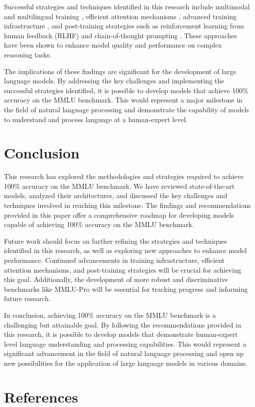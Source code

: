 \documentclass[conference]{IEEEtran}
\begin{document}
Successful strategies and techniques identified in this research include multimodal and multilingual training \cite{goodfellow2016deep}, efficient attention mechanisms \cite{vaswani2017attention}, advanced training infrastructure \cite{dean2012large}, and post-training strategies such as reinforcement learning from human feedback (RLHF) \cite{christiano2017deep} and chain-of-thought prompting \cite{wei2022chain}. These approaches have been shown to enhance model quality and performance on complex reasoning tasks.

The implications of these findings are significant for the development of large language models. By addressing the key challenges and implementing the successful strategies identified, it is possible to develop models that achieve 100\% accuracy on the MMLU benchmark. This would represent a major milestone in the field of natural language processing and demonstrate the capability of models to understand and process language at a human-expert level.

\section{Conclusion}
This research has explored the methodologies and strategies required to achieve 100\% accuracy on the MMLU benchmark. We have reviewed state-of-the-art models, analyzed their architectures, and discussed the key challenges and techniques involved in reaching this milestone. The findings and recommendations provided in this paper offer a comprehensive roadmap for developing models capable of achieving 100\% accuracy on the MMLU benchmark.

Future work should focus on further refining the strategies and techniques identified in this research, as well as exploring new approaches to enhance model performance. Continued advancements in training infrastructure, efficient attention mechanisms, and post-training strategies will be crucial for achieving this goal. Additionally, the development of more robust and discriminative benchmarks like MMLU-Pro will be essential for tracking progress and informing future research.

In conclusion, achieving 100\% accuracy on the MMLU benchmark is a challenging but attainable goal. By following the recommendations provided in this research, it is possible to develop models that demonstrate human-expert level language understanding and processing capabilities. This would represent a significant advancement in the field of natural language processing and open up new possibilities for the application of large language models in various domains.

\section{References}


\end{document}
